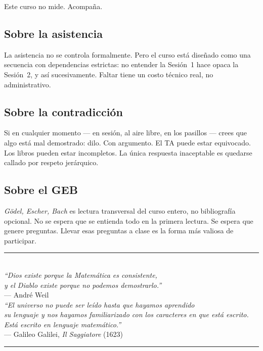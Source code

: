 \documentclass[11pt, letterpaper]{article}
\begin{document}
Este curso no mide. Acompa\~na.

\subsection*{Sobre la asistencia}
La asistencia no se controla formalmente. Pero el curso est\'a dise\~nado como una secuencia con dependencias estrictas: no entender la Sesi\'on~1 hace opaca la Sesi\'on~2, y as\'i sucesivamente. Faltar tiene un costo t\'ecnico real, no administrativo.

\subsection*{Sobre la contradicci\'on}
Si en cualquier momento --- en sesi\'on, al aire libre, en los pasillos --- crees que algo est\'a mal demostrado: dilo. Con argumento. El TA puede estar equivocado. Los libros pueden estar incompletos. La \'unica respuesta inaceptable es quedarse callado por respeto jer\'arquico.

\subsection*{Sobre el GEB}
\emph{G\"odel, Escher, Bach} es lectura transversal del curso entero, no bibliograf\'ia opcional. No se espera que se entienda todo en la primera lectura. Se espera que genere preguntas. Llevar esas preguntas a clase es la forma m\'as valiosa de participar.

\vspace{2cm}

\begin{center}
\textcolor{mitred}{\rule{0.5\linewidth}{0.6pt}}\\[0.4em]
{\small\itshape ``Dios existe porque la Matem\'atica es consistente,\\
y el Diablo existe porque no podemos demostrarlo.''}\\[0.3em]
{\footnotesize --- Andr\'e Weil}\\[0.8em]
{\small\itshape ``El universo no puede ser le\'ido hasta que hayamos aprendido\\
su lenguaje y nos hayamos familiarizado con los caracteres en que est\'a escrito.\\
Est\'a escrito en lenguaje matem\'atico.''}\\[0.3em]
{\footnotesize --- Galileo Galilei, \textit{Il Saggiatore} (1623)}\\
\textcolor{mitred}{\rule{0.5\linewidth}{0.6pt}}
\end{center}
\end{document}
